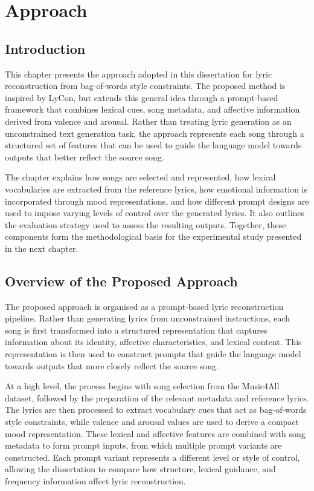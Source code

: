\chapter{Approach}

\section{Introduction}
This chapter presents the approach adopted in this dissertation for lyric reconstruction from bag-of-words style constraints. The proposed method is inspired by LyCon, but extends this general idea through a prompt-based framework that combines lexical cues, song metadata, and affective information derived from valence and arousal. Rather than treating lyric generation as an unconstrained text generation task, the approach represents each song through a structured set of features that can be used to guide the language model towards outputs that better reflect the source song.

The chapter explains how songs are selected and represented, how lexical vocabularies are extracted from the reference lyrics, how emotional information is incorporated through mood representations, and how different prompt designs are used to impose varying levels of control over the generated lyrics. It also outlines the evaluation strategy used to assess the resulting outputs. Together, these components form the methodological basis for the experimental study presented in the next chapter.

\section{Overview of the Proposed Approach}

The proposed approach is organised as a prompt-based lyric reconstruction pipeline. Rather than generating lyrics from unconstrained instructions, each song is first transformed into a structured representation that captures information about its identity, affective characteristics, and lexical content. This representation is then used to construct prompts that guide the language model towards outputs that more closely reflect the source song.

At a high level, the process begins with song selection from the Music4All dataset, followed by the preparation of the relevant metadata and reference lyrics. The lyrics are then processed to extract vocabulary cues that act as bag-of-words style constraints, while valence and arousal values are used to derive a compact mood representation. These lexical and affective features are combined with song metadata to form prompt inputs, from which multiple prompt variants are constructed. Each prompt variant represents a different level or style of control, allowing the dissertation to compare how structure, lexical guidance, and frequency information affect lyric reconstruction.

